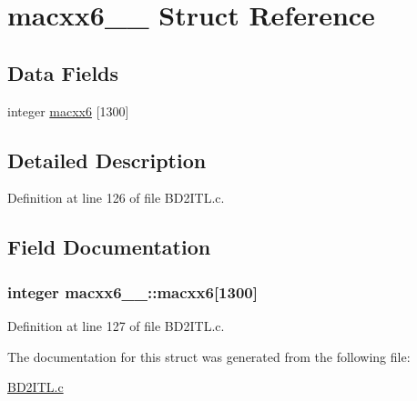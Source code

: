 \hypertarget{structmacxx6__1__}{}\section{macxx6\+\_\+\_\+ Struct Reference}
\label{structmacxx6__1__}
\subsection*{Data Fields}
\begin{DoxyCompactItemize}
\item 
integer \hyperlink{structmacxx6__1___a5e39935986eb00dc9939f33b8e1ce45d}{macxx6} \mbox{[}1300\mbox{]}
\end{DoxyCompactItemize}


\subsection{Detailed Description}


Definition at line 126 of file B\+D2\+I\+T\+L.\+c.



\subsection{Field Documentation}
\subsubsection[{\texorpdfstring{macxx6}{macxx6}}]{\setlength{\rightskip}{0pt plus 5cm}integer macxx6\+\_\+\_\+\+::macxx6\mbox{[}1300\mbox{]}}\hypertarget{structmacxx6__1___a5e39935986eb00dc9939f33b8e1ce45d}{}\label{structmacxx6__1___a5e39935986eb00dc9939f33b8e1ce45d}


Definition at line 127 of file B\+D2\+I\+T\+L.\+c.



The documentation for this struct was generated from the following file\+:\begin{DoxyCompactItemize}
\item 
\hyperlink{BD2ITL_8c}{B\+D2\+I\+T\+L.\+c}\end{DoxyCompactItemize}
